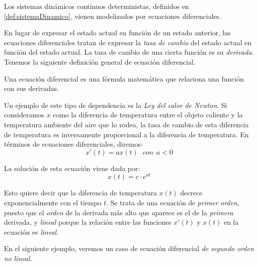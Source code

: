 Los sistemas dinámicos continuos deterministas, definidos en \ref{def:sistemaDinamico}, vienen modelizados por ecuaciones diferenciales.

En lugar de expresar el estado actual en función de un estado anterior, las ecuaciones diferenciales tratan de expresar la \emph{tasa de cambio} del estado actual en función del estado actual. La tasa de cambio de una cierta función es su \emph{derivada}. Tenemos la siguiente definición general de ecuación diferencial.

\begin{definition}
Una ecuación diferencial es una fórmula matemática que relaciona una función con sus derivadas.
\end{definition}

\begin{example}\label{ex:calor}
Un ejemplo de este tipo de dependencia es la \emph{Ley del calor de Newton}. Si consideramos $x$ como la diferencia de temperatura entre el objeto caliente y la temperatura ambiente del aire que lo rodea, la tasa de cambio de esta diferencia de temperatura es inversamente proporcional a la diferencia de temperatura. En términos de ecuaciones diferenciales, diremos:
\begin{equation}
x'(t) = ax(t)~~~con~~ a<0
\end{equation}

La solución de esta ecuación viene dada por:
\begin{equation}
x(t) = c\cdot e^{at}
\end{equation}

Esto quiere decir que la diferencia de temperatura $x(t)$ decrece exponencialmente con el tiempo $t$. Se trata de una ecuación  de \emph{primer orden}, puesto que el \emph{orden} de la derivada más alto que aparece es el de la \emph{primera} derivada, y \emph{lineal} porque la relación entre las funciones $x'(t)$ y $x(t)$ en la ecuación es \emph{lineal}.
\end{example}

En el siguiente ejemplo, veremos un caso de ecuación diferencial \emph{de segundo orden} \emph{no lineal}.

